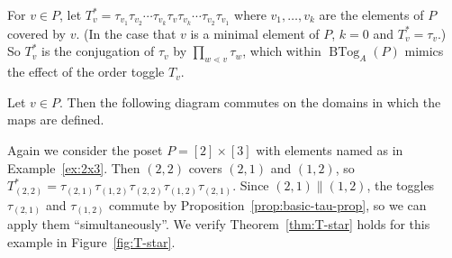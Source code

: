 \documentclass[ALCO,ThmDefs,Unicode,epreuves]{cedram}
\newcommand{\kk}{\mathbb{K}}
\newcommand{\up}{\Delta}
\DeclareMathOperator{\BTog}{BTog}
\newenvironment{absolutelynopagebreak}
 {\par\nobreak\vfil\penalty0\vfilneg
 \vtop\bgroup}
 {\par\xdef\tpd{\the\prevdepth}\egroup
 \prevdepth=\tpd}
\begin{document}
\begin{defi}
For $v\in P$, let $T_v^* =\tau_{v_1}\tau_{v_2}\cdots \tau_{v_k} \tau_v \tau_{v_k}\cdots
\tau_{v_2}\tau_{v_1}$ where $v_1,\dots,v_k$ are the elements of $P$ covered by $v$. (In the
case that $v$ is a minimal element of $P$, $k=0$ and $T_v^*=\tau_v$.) So $T_v^*$ is the
conjugation of $\tau_{v}$ by $\prod_{w\lessdot v}\tau_{w}$, which within $\BTog_{A}(P)$ mimics the effect of
the order toggle $T_{v}$. 

\end{defi}

\begin{theo}\label{thm:T-star}
Let $v\in P$. Then the following diagram commutes on the domains in which the maps are defined.
\begin{center}
\end{center}
\end{theo}

\begin{exam}\label{ex:T-star}
Again we consider the poset $P=[2]\times[3]$ with elements named as in Example~\ref{ex:2x3}.
Then $(2,2)$ covers $(2,1)$ and $(1,2)$, so
$T_{(2,2)}^*=\tau_{(2,1)}\tau_{(1,2)} \tau_{(2,2)} \tau_{(1,2)}\tau_{(2,1)}$.
Since
$(2,1)\parallel (1,2)$, the toggles $\tau_{(2,1)}$ and $\tau_{(1,2)}$ commute by
Proposition~\ref{prop:basic-tau-prop}, so we can apply them ``simultaneously''.
We verify
Theorem~\ref{thm:T-star} holds for this example in Figure~\ref{fig:T-star}.
\end{exam}
\end{document}
